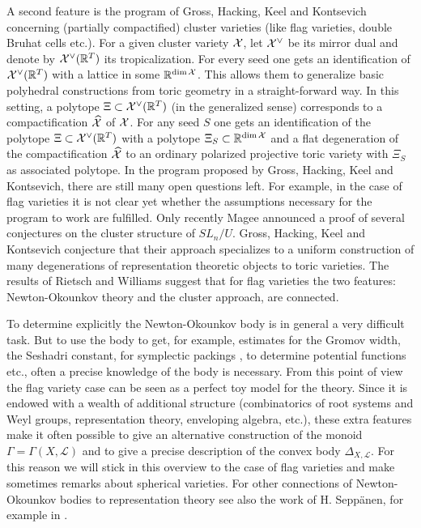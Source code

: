 \documentclass{emsprocart}
\theoremstyle{definition}
\begin{document}
A second feature is the program of Gross, Hacking, Keel and Kontsevich \cite{GHKK}
concerning (partially compactified) cluster varieties (like flag varieties, double Bruhat cells etc.).
For a given cluster variety ${\cal X}$, let ${\cal X}^\vee$ be its mirror dual and denote
by  ${\cal X}^\vee({\mathbb R}^T)$ its tropicalization. For every seed one gets an identification 
of ${\cal X}^\vee({\mathbb R}^T)$ with a lattice in some $\mathbb R^{\dim \cal X}$.
This allows them to generalize basic polyhedral constructions from toric geometry
in a straight-forward way. In this setting, a polytope $\Xi\subset {\cal X}^\vee({\mathbb R}^T)$ (in the generalized sense) 
corresponds to a compactification $\widehat{\cal X}$ of ${\cal X}$. For any seed $S$ one gets 
an identification of the polytope $\Xi\subset {\cal X}^\vee({\mathbb R}^T)$ with a polytope 
$\Xi_S\subset {\mathbb R}^{\dim \cal X}$ and a flat degeneration 
of the compactification $\widehat{\cal X}$ to an ordinary polarized projective toric variety
with $\Xi_S$ as associated polytope.
In the program proposed by Gross, Hacking, Keel and Kontsevich, there are still many open questions
left. For example, in the case of flag varieties it is not clear yet whether the assumptions necessary 
for the program to work are fulfilled. Only recently Magee \cite{M} announced 
a proof of several conjectures on the cluster structure of $SL_n/U$. Gross, Hacking, Keel and Kontsevich 
conjecture \cite{GHKK} that their approach specializes to a uniform construction of many degenerations of representation 
theoretic objects to toric varieties. The results of Rietsch and Williams \cite{RW} suggest that for flag varieties
the two features: Newton-Okounkov theory and the cluster approach, are connected.

To determine explicitly the Newton-Okounkov body is in general a very difficult task. But to use the body to get,
for example, estimates for the Gromov width, the Seshadri constant, for symplectic packings  \cite{FLP, HP,  I, K2}, to determine potential functions 
\cite{NNU1,NNU2} etc.,
often a precise knowledge of the body is necessary. From this point of view the flag variety case can be seen
as a perfect toy model for the theory. Since it is endowed with a wealth of additional structure
(combinatorics of root systems and Weyl groups, representation theory, enveloping algebra, etc.), these extra features make it often 
possible to give an alternative construction of the monoid $\Gamma=\Gamma(X,\mathcal L)$ and to give 
a precise description of the convex body $\Delta_{X,\mathcal L}$. 
For this reason we will stick in this overview to the case of flag varieties and make sometimes
remarks about spherical varieties. For other connections of Newton-Okounkov bodies to representation theory see
also the work of H. Sepp\"anen, for example in \cite{Se}. 
\end{document}
